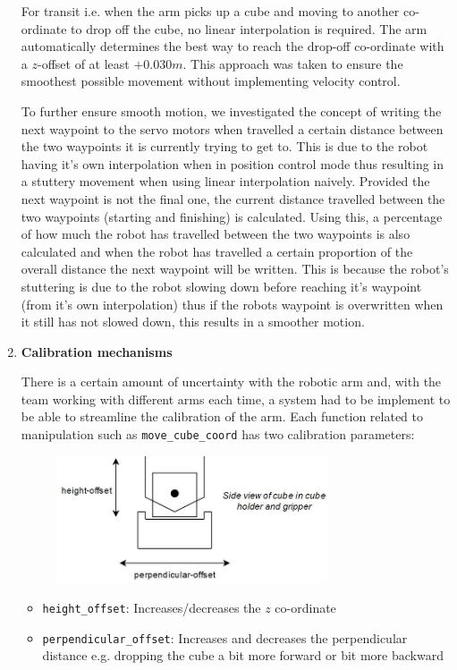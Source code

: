 \documentclass[9pt, a4paper]{article}
\begin{document}
\begin{enumerate}
  For transit i.e. when the arm picks up a cube and moving to another
  co-ordinate to drop off the cube, no linear interpolation is required. The arm
  automatically determines the best way to reach the drop-off co-ordinate with a
  $z$-offset of at least $+0.030m$. This approach was taken to ensure the
  smoothest possible movement without implementing velocity control. 
  
  To further ensure smooth motion, we investigated the concept of writing the
  next waypoint to the servo motors when travelled a certain distance between
  the two waypoints it is currently trying to get to. This is due to the robot
  having it's own interpolation when in position control mode thus resulting in
  a stuttery movement when using linear interpolation naively. Provided the next
  waypoint is not the final one, the current distance travelled between the two
  waypoints (starting and finishing) is calculated. Using this, a percentage of
  how much the robot has travelled between the two waypoints is also calculated
  and when the robot has travelled a certain proportion of the overall distance
  the next waypoint will be written. This is because the robot's stuttering is
  due to the robot slowing down before reaching it's waypoint (from it's own
  interpolation) thus if the robots waypoint is overwritten when it still has
  not slowed down, this results in a smoother motion.
 
  \item \textbf{Calibration mechanisms}
  
  There is a certain amount of uncertainty with the robotic arm and, with the
  team working with different arms each time, a system had to be
  implement to be able to streamline the calibration of the arm. Each function
  related to manipulation such as \verb+move_cube_coord+ has two calibration
  parameters: 
  \begin{figure}[h]
      \centering
      \includegraphics[width=8cm]{side view.JPG}
  \end{figure}
  \begin{itemize}
    \item \verb+height_offset+: Increases/decreases the $z$ co-ordinate  
    \item \verb+perpendicular_offset+: Increases and decreases the perpendicular
    distance e.g. dropping the cube a bit more forward or bit more backward
  \end{itemize}
\end{enumerate}
\end{document}
